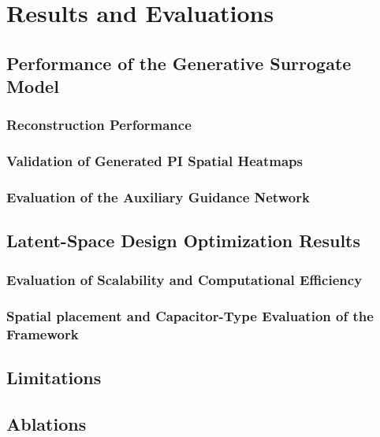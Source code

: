 
\chapter{Results and Evaluations}
\label{ch:results_evaluations}

\section{Performance of the Generative Surrogate Model}
\label{sec:surrogate_performance}

\subsection{Reconstruction Performance}
\label{subsec:reconstruction_perf}

\subsection{Validation of Generated PI Spatial Heatmaps}
\label{subsec:val_pi_heatmaps}

\subsection{Evaluation of the Auxiliary Guidance Network}
\label{subsec:eval_aux_guidance}

\section{Latent-Space Design Optimization Results}
\label{sec:latent_design_opt_results}

\subsection{Evaluation of Scalability and Computational Efficiency}
\label{subsec:eval_scalability_efficiency}

\subsection{Spatial placement and Capacitor-Type Evaluation of the Framework}
\label{subsec:spatial_cap_type_eval}

\section{Limitations}
\label{sec:limitations}

\section{Ablations}
\label{sec:ablations}


